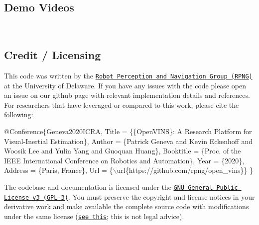 \subsection*{Demo Videos}

\href{http://www.youtube.com/watch?v=KCX51GvYGss}{\tt } \href{http://www.youtube.com/watch?v=Lc7VQHngSuQ}{\tt } \href{http://www.youtube.com/watch?v=vaia7iPaRW8}{\tt } \href{http://www.youtube.com/watch?v=MCzTF9ye2zw}{\tt } \href{http://www.youtube.com/watch?v=eSQLWcNrx_I}{\tt } ~\newline


\href{http://www.youtube.com/watch?v=187AXuuGNNw}{\tt } \href{http://www.youtube.com/watch?v=oUoLlrFryk0}{\tt } \href{http://www.youtube.com/watch?v=ExPIGwORm4E}{\tt } \href{http://www.youtube.com/watch?v=lXHl-qgLGl8}{\tt }

\subsection*{Credit / Licensing}

This code was written by the \href{https://sites.udel.edu/robot/}{\tt Robot Perception and Navigation Group (R\+P\+NG)} at the University of Delaware. If you have any issues with the code please open an issue on our github page with relevant implementation details and references. For researchers that have leveraged or compared to this work, please cite the following\+:


\begin{DoxyCode}
@Conference\{Geneva2020ICRA,
  Title      = \{\{OpenVINS\}: A Research Platform \textcolor{keywordflow}{for} Visual-Inertial Estimation\},
  Author     = \{Patrick Geneva and Kevin Eckenhoff and Woosik Lee and Yulin Yang and Guoquan Huang\},
  Booktitle  = \{Proc. of the IEEE International Conference on Robotics and Automation\},
  Year       = \{2020\},
  Address    = \{Paris, France\},
  Url        = \{\(\backslash\)url\{https:\textcolor{comment}{//github.com/rpng/open\_vins\}\}}
\}
\end{DoxyCode}


The codebase and documentation is licensed under the \href{https://www.gnu.org/licenses/gpl-3.0.txt}{\tt G\+NU General Public License v3 (G\+P\+L-\/3)}. You must preserve the copyright and license notices in your derivative work and make available the complete source code with modifications under the same license (\href{https://choosealicense.com/licenses/gpl-3.0/}{\tt see this}; this is not legal advice). 
